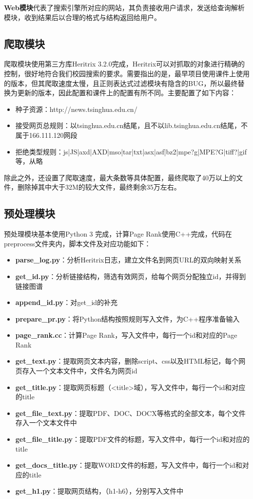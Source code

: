 \documentclass[paper=a4, fontsize=11pt, UTF8]{article} %
\numberwithin{equation}{section} %
\numberwithin{figure}{section} %
\numberwithin{table}{section} %
\begin{document}
\textbf{Web模块}代表了搜索引擎所对应的网站，其负责接收用户请求，发送给查询解析模块，收到结果后以合理的格式与结构返回给用户。

\subsection{爬取模块}

爬取模块使用第三方库Heritrix 3.2.0完成，Heritrix可以对抓取的对象进行精确的控制，很好地符合我们校园搜索的要求。需要指出的是，最早项目使用课件上使用的版本，但其爬取速度太慢，且正则表达式过滤模块有隐含的BUG，所以最终替换为更新的版本，因此配置和课件上的配置有所不同。主要配置了如下内容：

\begin{itemize}
\item 种子资源：http://news.tsinghua.edu.cn/
\item 接受网页总规则：以tsinghua.edu.cn结尾，且不以lib.tsinghua.edu.cn结尾，不属于166.111.120网段
\item 拒绝类型规则：js|JS|axd|AXD|mso|tar|txt|asx|asf|bz2|mpe?g|MPE?G|tiff?|gif等，从略
\end{itemize}

除此之外，还设置了爬取速度，最大条数等具体配置，最终爬取了40万以上的文件，删除掉其中大于32M的较大文件，最终剩余35万左右。

\subsection{预处理模块}

预处理模块基本使用Python 3 完成，计算Page Rank使用C++完成，代码在preprocess文件夹内，脚本文件及对应功能如下：

\begin{itemize}
\item \textbf{parse\_log.py}：分析Heritrix日志，建立文件名到网页URL的双向映射关系
\item \textbf{get\_id.py}：分析链接结构，筛选有效网页，给每个网页分配独立id，并得到链接图谱
\item \textbf{append\_id.py}：对get\_id的补充
\item \textbf{prepare\_pr.py}：将Python结构按照规则写入文件，为C++程序准备输入
\item \textbf{page\_rank.cc}：计算Page Rank，写入文件中，每行一个id和对应的Page Rank
\item \textbf{get\_text.py}：提取网页文本内容，删除script、css以及HTML标记，每个网页存入一个文本文件中，文件名为网页id
\item \textbf{get\_title.py}：提取网页标题（<title>域），写入文件中，每行一个id和对应的title
\item \textbf{get\_file\_text.py}：提取PDF、DOC、DOCX等格式的全部文本，每个文件存入一个文本文件中
\item \textbf{get\_file\_title.py}：提取PDF文件的标题，写入文件中，每行一个id和对应的title
\item \textbf{ get\_docs\_title.py}：提取WORD文件的标题，写入文件中，每行一个id和对应的title
\item \textbf{get\_h1.py}：提取网页结构，（h1-h6），分别写入文件中
\end{itemize}
\end{document}
